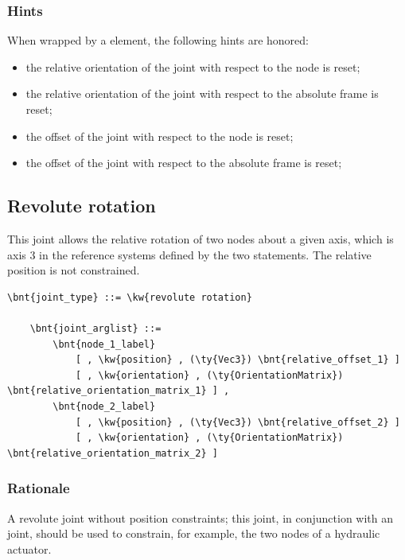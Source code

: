 \subsubsection{Hints}
When wrapped by a  element, the following hints are honored:
\begin{itemize}
\item {} the relative orientation of the joint
with respect to the node is reset;
\item {} the relative orientation of the joint
with respect to the absolute frame is reset;
\item {} the offset of the joint
with respect to the node is reset;
\item {} the offset of the joint
with respect to the absolute frame is reset;
\end{itemize}






\subsection{Revolute rotation}
\label{sec:EL:STRUCT:JOINT:REVOLUTE_ROTATION}
This joint allows the relative rotation of two nodes about
a given axis, which is axis 3 in the reference systems defined 
by the two  statements.
The relative position is not constrained.
\begin{Verbatim}[commandchars=\\\{\}]
    \bnt{joint_type} ::= \kw{revolute rotation}

    \bnt{joint_arglist} ::= 
        \bnt{node_1_label}
            [ , \kw{position} , (\ty{Vec3}) \bnt{relative_offset_1} ]
            [ , \kw{orientation} , (\ty{OrientationMatrix}) \bnt{relative_orientation_matrix_1} ] ,
        \bnt{node_2_label}
            [ , \kw{position} , (\ty{Vec3}) \bnt{relative_offset_2} ]
            [ , \kw{orientation} , (\ty{OrientationMatrix}) \bnt{relative_orientation_matrix_2} ]
\end{Verbatim}

\subsubsection{Rationale}
A revolute joint without position constraints; this joint, in conjunction
with an  joint, should be used to constrain, for example,
the two nodes of a hydraulic actuator.

